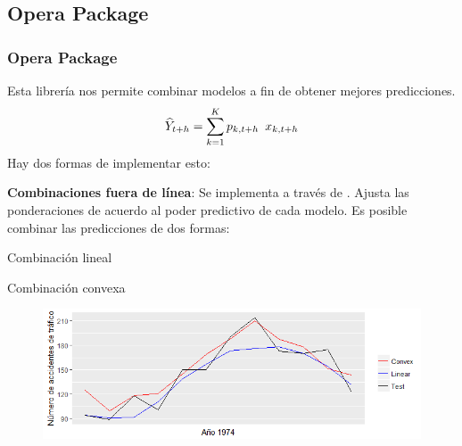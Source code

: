 \documentclass[10pt,a4paper,twoside]{beamer}
\begin{document}

\subsection{Opera Package}


\begin{frame}
\frametitle{Opera Package}
Esta librería nos permite combinar modelos a fin de obtener mejores predicciones.\\
\begin{equation*}
    \widehat{Y}_{t+h} = \sum_{k = 1}^{K} p_{k,t+h} \enskip  x_{k,t+h}
\end{equation*}
Hay dos formas de implementar esto:
\begin{itemize*}
\item \textbf{Combinaciones fuera de línea}: Se implementa a través de . Ajusta las ponderaciones de acuerdo al poder predictivo de cada modelo. Es posible combinar las predicciones de dos formas:
    \begin{itemize*}
    \item Combinación lineal
    \item Combinación convexa
    \end{itemize*}
\end{itemize*}

\begin{figure}
    \centering
    \centerline{\includegraphics[scale = 0.5]{Images/336337.png}}
\end{figure}

\end{frame}

\end{document}
